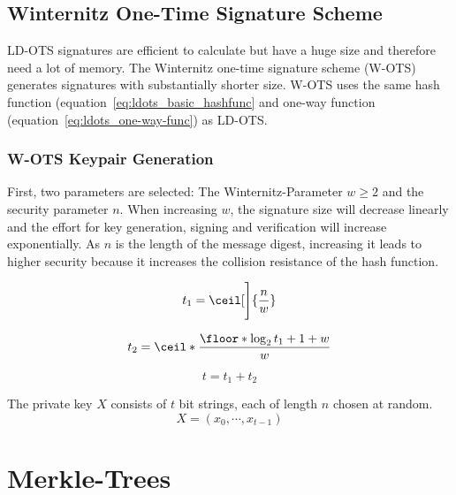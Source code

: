 \subsection{Winternitz One-Time Signature Scheme}
LD-OTS signatures are efficient to calculate but have a huge size and therefore need a lot of memory. The Winternitz one-time signature scheme (W-OTS) generates signatures with substantially shorter size. W-OTS uses the same hash function (equation~\ref{eq:ldots_basic_hashfunc} and one-way function (equation~\ref{eq:ldots_one-way-func}) as LD-OTS. %

\subsubsection{W-OTS Keypair Generation}
First, two parameters are selected: The Winternitz-Parameter $w \geq 2$ and the security parameter $n$. When increasing $w$, the signature size will decrease linearly and the effort for key generation, signing and verification will increase exponentially. As $n$ is the length of the message digest, increasing it leads to higher security because it increases the collision resistance of the hash function. 


\begin{equation}
\label{eq:t1}
t_1 = \ceil[\Bigg]{\frac{n}{w}}
\end{equation}

\begin{equation}
\label{eq:t2}
t_2 = \ceil*{\frac{\floor*{\log_2 t_1} + 1 + w}{w} }
\end{equation}

\begin{equation}
t = t_1 + t_2
\end{equation}

The private key $X$ consists of $t$ bit strings, each of length $n$ chosen at random.
\begin{equation}
X = (x_0, \cdots, x_{t-1})
\end{equation}



\section{Merkle-Trees}
